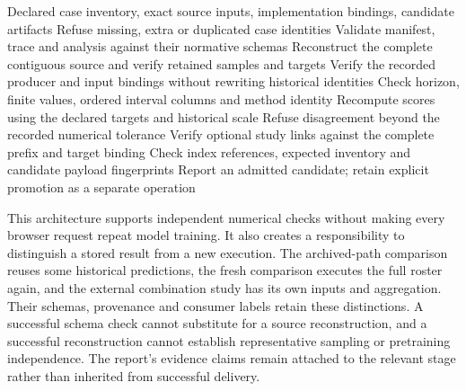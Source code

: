 \begin{algorithm}[htbp]
\caption{Admit a complete forecast artifact candidate against its declared source and execution identities before explicit promotion.}
\label{alg:artifact-admission}
\begin{algorithmic}[1]
\Require Declared case inventory, exact source inputs, implementation bindings, candidate artifacts
\State Refuse missing, extra or duplicated case identities
  \State Validate manifest, trace and analysis against their normative schemas
  \State Reconstruct the complete contiguous source and verify retained samples and targets
  \State Verify the recorded producer and input bindings without rewriting historical identities
    \State Check horizon, finite values, ordered interval columns and method identity
    \State Recompute scores using the declared targets and historical scale
    \State Refuse disagreement beyond the recorded numerical tolerance
  \EndFor
  \State Verify optional study links against the complete prefix and target binding
\EndFor
\State Check index references, expected inventory and candidate payload fingerprints
\State Report an admitted candidate; retain explicit promotion as a separate operation
\end{algorithmic}
\end{algorithm}

This architecture supports independent numerical checks without making every browser request repeat model training. It also creates a responsibility to distinguish a stored result from a new execution. The archived-path comparison reuses some historical predictions, the fresh comparison executes the full roster again, and the external combination study has its own inputs and aggregation. Their schemas, provenance and consumer labels retain these distinctions. A successful schema check cannot substitute for a source reconstruction, and a successful reconstruction cannot establish representative sampling or pretraining independence. The report's evidence claims remain attached to the relevant stage rather than inherited from successful delivery.

